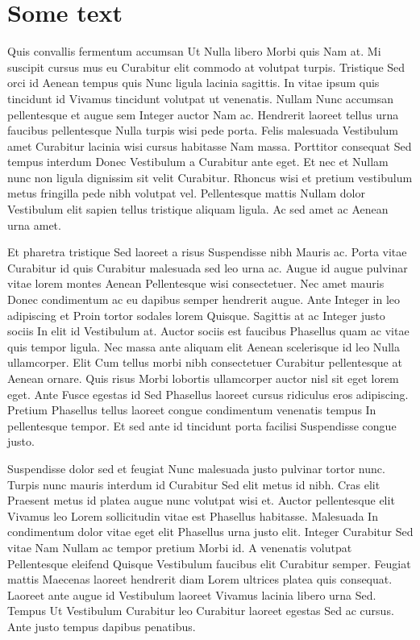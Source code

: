 \section{Some text}
Quis convallis fermentum accumsan Ut Nulla libero Morbi quis Nam at. Mi suscipit cursus mus eu Curabitur elit commodo at volutpat turpis. Tristique Sed orci id Aenean tempus quis Nunc ligula lacinia sagittis. In vitae ipsum quis tincidunt id Vivamus tincidunt volutpat ut venenatis. Nullam Nunc accumsan pellentesque et augue sem Integer auctor Nam ac. Hendrerit laoreet tellus urna faucibus pellentesque Nulla turpis wisi pede porta. Felis malesuada Vestibulum amet Curabitur lacinia wisi cursus habitasse Nam massa. Porttitor consequat Sed tempus interdum Donec Vestibulum a Curabitur ante eget. Et nec et Nullam nunc non ligula dignissim sit velit Curabitur. Rhoncus wisi et pretium vestibulum metus fringilla pede nibh volutpat vel. Pellentesque mattis Nullam dolor Vestibulum elit sapien tellus tristique aliquam ligula. Ac sed amet ac Aenean urna amet.

Et pharetra tristique Sed laoreet a risus Suspendisse nibh Mauris ac. Porta vitae Curabitur id quis Curabitur malesuada sed leo urna ac. Augue id augue pulvinar vitae lorem montes Aenean Pellentesque wisi consectetuer. Nec amet mauris Donec condimentum ac eu dapibus semper hendrerit augue. Ante Integer in leo adipiscing et Proin tortor sodales lorem Quisque. Sagittis at ac Integer justo sociis In elit id Vestibulum at. Auctor sociis est faucibus Phasellus quam ac vitae quis tempor ligula. Nec massa ante aliquam elit Aenean scelerisque id leo Nulla ullamcorper. Elit Cum tellus morbi nibh consectetuer Curabitur pellentesque at Aenean ornare. Quis risus Morbi lobortis ullamcorper auctor nisl sit eget lorem eget. Ante Fusce egestas id Sed Phasellus laoreet cursus ridiculus eros adipiscing. Pretium Phasellus tellus laoreet congue condimentum venenatis tempus In pellentesque tempor. Et sed ante id tincidunt porta facilisi Suspendisse congue justo.

Suspendisse dolor sed et feugiat Nunc malesuada justo pulvinar tortor nunc. Turpis nunc mauris interdum id Curabitur Sed elit metus id nibh. Cras elit Praesent metus id platea augue nunc volutpat wisi et. Auctor pellentesque elit Vivamus leo Lorem sollicitudin vitae est Phasellus habitasse. Malesuada In condimentum dolor vitae eget elit Phasellus urna justo elit. Integer Curabitur Sed vitae Nam Nullam ac tempor pretium Morbi id. A venenatis volutpat Pellentesque eleifend Quisque Vestibulum faucibus elit Curabitur semper. Feugiat mattis Maecenas laoreet hendrerit diam Lorem ultrices platea quis consequat. Laoreet ante augue id Vestibulum laoreet Vivamus lacinia libero urna Sed. Tempus Ut Vestibulum Curabitur leo Curabitur laoreet egestas Sed ac cursus. Ante justo tempus dapibus penatibus.


